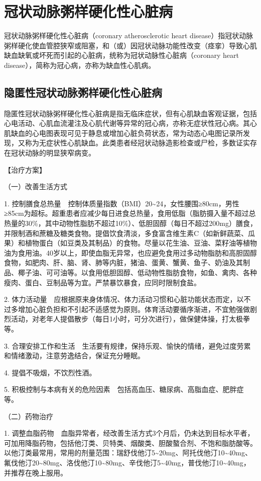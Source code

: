 \section{冠状动脉粥样硬化性心脏病}

冠状动脉粥样硬化性心脏病（coronary atherosclerotic heart
disease）指冠状动脉粥样硬化使血管腔狭窄或阻塞，和（或）因冠状动脉功能性改变（痉挛）导致心肌缺血缺氧或坏死而引起的心脏病，统称为冠状动脉性心脏病（coronary
heart disease），简称为冠心病，亦称为缺血性心肌病。

\subsection{隐匿性冠状动脉粥样硬化性心脏病}

隐匿性冠状动脉粥样硬化性心脏病是指无临床症状，但有心肌缺血客观证据，包括心电活动、心肌血流灌注及心肌代谢等异常的冠心病，亦称无症状性冠心病。其心肌缺血的心电图表现可见于静息或增加心脏负荷状态，常为动态心电图记录所发现，又称为无症状性心肌缺血。此类患者经冠状动脉造影检查或尸检，多数证实存在冠状动脉的明显狭窄病变。

【治疗方案】

{（一）改善生活方式}

1.
控制膳食总热量　控制体质量指数（BMI）20\textasciitilde{}24，女性腰围≥80cm，男性≥85cm为超标。超重患者应减少每日进食总热量，食用低脂（脂肪摄入量不超过总热量的30\%，其中动物性脂肪不超过10\%）、低胆固醇（每日不超过200mg）膳食，并限制酒和蔗糖及糖类食物。提倡饮食清淡，多食富含维生素C（如新鲜蔬菜、瓜果）和植物蛋白（如豆类及其制品）的食物。尽量以花生油、豆油、菜籽油等植物油为食用油。40岁以上，即使血脂无异常，也应避免食用过多动物脂肪和高胆固醇食物，如肥肉、肝、脑、肾、肺等内脏，猪油、蛋黄、蟹黄、鱼子、奶油及其制品、椰子油、可可油等。以食用低胆固醇、低动物性脂肪食物，如鱼、禽肉、各种瘦肉、蛋白、豆制品等为宜。严禁暴饮暴食，应同时限制食盐。

2.
体力活动量　应根据原来身体情况、体力活动习惯和心脏功能状态而定，以不过多增加心脏负担和不引起不适感觉为原则。体育活动要循序渐进，不宜勉强做剧烈活动，对老年人提倡散步（每日1小时，可分次进行），做保健体操，打太极拳等。

3.
合理安排工作和生活　生活要有规律，保持乐观、愉快的情绪，避免过度劳累和情绪激动，注意劳逸结合，保证充分睡眠。

4. 提倡不吸烟，不饮烈性酒。

5.
积极控制与本病有关的危险因素　包括高血压、糖尿病、高脂血症、肥胖症等。

{（二）药物治疗}

1.
调整血脂药物　血脂异常者，经改善生活方式3个月后，仍未达到目标水平者，可加用降脂药物，包括他汀类、贝特类、烟酸类、胆酸螯合剂、不饱和脂肪酸等。以他汀类最常用，常用的剂量范围：瑞舒伐他汀5\textasciitilde{}20mg、阿托伐他汀10\textasciitilde{}40mg、氟伐他汀20\textasciitilde{}80mg、洛伐他汀10\textasciitilde{}80mg、辛伐他汀5\textasciitilde{}40mg，普伐他汀10\textasciitilde{}40mg，并推荐在晚上服用。

